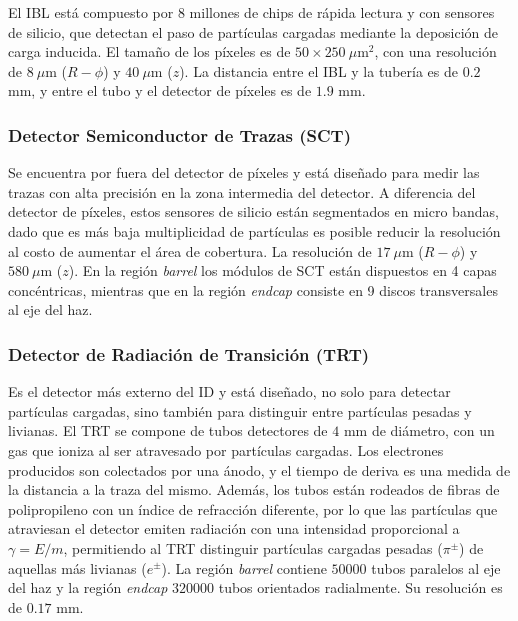El IBL está compuesto por $8$ millones de chips de rápida lectura y con sensores de silicio, que detectan el paso de partículas cargadas mediante la deposición de carga inducida. El tamaño de los píxeles es de $50\times250\:\mu$m$^{2}$, con una resolución de $8\:\mu$m ($R-\phi$) y $40\:\mu$m ($z$). La distancia entre el IBL y la tubería es de $0.2$ mm, y entre el tubo y el detector de píxeles es de $1.9$ mm. 


\subsubsection{Detector Semiconductor de Trazas (SCT)}

Se encuentra por fuera del detector de píxeles y está diseñado para medir las trazas con alta precisión en la zona intermedia del detector. A diferencia del detector de píxeles, estos sensores de silicio están segmentados en micro bandas, dado que es más baja multiplicidad de partículas es posible reducir la resolución al costo de aumentar el área de cobertura. La resolución de $17\:\mu$m ($R-\phi$) y $580\:\mu$m ($z$). En la región \textit{barrel} los módulos de SCT están dispuestos en 4 capas concéntricas, mientras que en la región \textit{endcap} consiste en 9 discos transversales al eje del haz.


\subsubsection{Detector de Radiación de Transición (TRT)}

Es el detector más externo del ID y está diseñado, no solo para detectar partículas cargadas, sino también para distinguir entre partículas pesadas y livianas. El TRT se compone de tubos detectores de $4$ mm de diámetro, con un gas que ioniza al ser atravesado por partículas cargadas. Los electrones producidos son colectados por una ánodo, y el tiempo de deriva es una medida de la distancia a la traza del mismo. Además, los tubos están rodeados de fibras de polipropileno con un índice de refracción diferente, por lo que las partículas que atraviesan el detector emiten radiación con una intensidad proporcional a $\gamma=E/m$, permitiendo al TRT  distinguir partículas cargadas pesadas ($\pi^{\pm}$) de aquellas más livianas ($e^{\pm}$). La región \textit{barrel} contiene $50000$ tubos paralelos al eje del haz y la región \textit{endcap} $320000$ tubos orientados radialmente. Su resolución es de $0.17$ mm.

